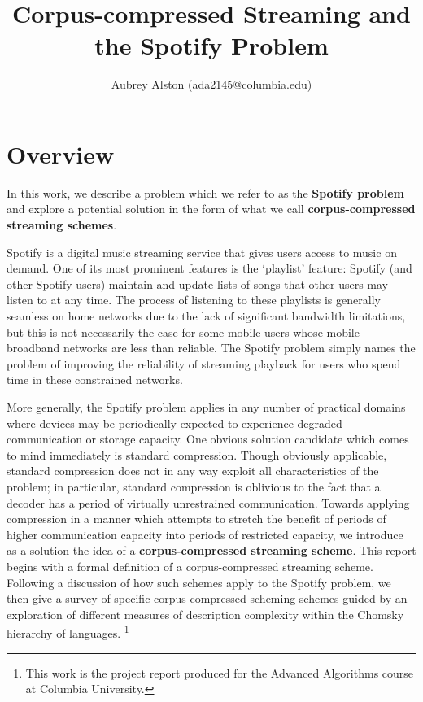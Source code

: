 \documentclass{article}
\title{Corpus-compressed Streaming and the Spotify Problem}
\author{Aubrey Alston (ada2145@columbia.edu)}
\date{}
\theoremstyle{definition}
\begin{document}
\maketitle

\section{Overview}

In this work, we describe a problem which we refer to as the \textbf{Spotify problem} and explore a 
potential solution in the form of what we call \textbf{corpus-compressed streaming schemes}.

Spotify is a digital music streaming service that gives users access to music on demand.
One of its most prominent features is the `playlist' feature: Spotify (and other Spotify users)
maintain and update lists of songs that other users may listen to at any time.  The process of listening 
to these playlists is generally seamless on home networks due to the lack of significant bandwidth 
limitations, but this is not necessarily the case for some mobile users whose mobile broadband networks are 
less than reliable.  The Spotify problem simply names the problem of improving the reliability of streaming playback for users who spend time in these constrained networks.

More generally, the Spotify problem applies in any number of practical domains where devices 
may be periodically expected to experience degraded communication or storage capacity.  One 
obvious solution candidate which comes to mind immediately is standard compression.  Though obviously 
applicable, standard compression does not in any way exploit all characteristics 
of the problem; in particular, standard compression is oblivious to the fact that a decoder 
has a period of virtually unrestrained communication.  Towards 
applying compression in a manner which attempts to stretch the benefit of periods of higher communication 
capacity into periods of restricted capacity, we introduce as a solution the idea of a 
\textbf{corpus-compressed streaming scheme}.  
\newline\newline
This report begins with a formal definition of a corpus-compressed streaming scheme.  Following a 
discussion of how such schemes apply to the Spotify problem, we then give a survey of specific
corpus-compressed scheming schemes guided by an exploration of different measures of description 
complexity within the Chomsky hierarchy of languages. \footnote{This work is the project report produced for the Advanced Algorithms course 
at Columbia University.}
\newline\newline
\end{document}

